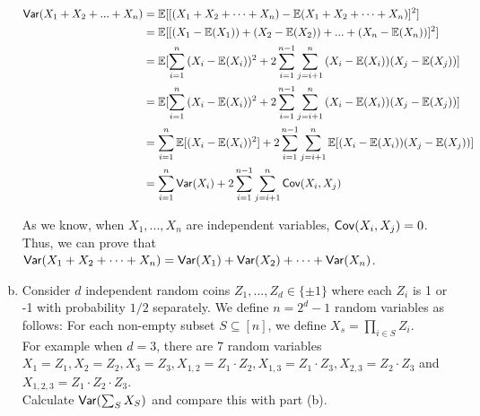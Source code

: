 \begin{problem}[30 points]
\begin{enumerate}[(a)]
\begin{equation}
\begin{aligned}
\mathsf{Var}(X_1 + X_2 + ... + X_n) &= \operatorname*{\mathbb{E}}[[(X_1 + X_2 + \cdots + X_n) - \operatorname*{\mathbb{E}}(X_1 + X_2 + \cdots + X_n)]^2] \\
& = \operatorname*{\mathbb{E}}[[(X_1 - \operatorname*{\mathbb{E}}(X_1)) + (X_2 - \operatorname*{\mathbb{E}}(X_2)) + ... + (X_n - \operatorname*{\mathbb{E}}(X_n))]^2] \\
& = \operatorname*{\mathbb{E}}[\sum_{i=1}^{n}{(X_i - \operatorname*{\mathbb{E}}(X_i))^2} + 2\sum_{i=1}^{n-1}\sum_{j=i+1}^{n}{(X_i - \operatorname*{\mathbb{E}}(X_i))(X_j - \operatorname*{\mathbb{E}}(X_j))}] \\
& = \operatorname*{\mathbb{E}}[\sum_{i=1}^{n}{(X_i - \operatorname*{\mathbb{E}}(X_i))^2} + 2\sum_{i=1}^{n-1}\sum_{j=i+1}^{n}{(X_i - \operatorname*{\mathbb{E}}(X_i))(X_j - \operatorname*{\mathbb{E}}(X_j))}] \\
& = \sum_{i=1}^{n}{\operatorname*{\mathbb{E}}[(X_i - \operatorname*{\mathbb{E}}(X_i))^2]} + 2\sum_{i=1}^{n-1}\sum_{j=i+1}^{n}{\operatorname*{\mathbb{E}}[(X_i - \operatorname*{\mathbb{E}}(X_i))(X_j - \operatorname*{\mathbb{E}}(X_j))]} \notag \\
& = \sum_{i=1}^{n}{\mathsf{Var}(X_i)} + 2\sum_{i=1}^{n-1}\sum_{j=i+1}^{n}{\mathsf{Cov}(X_i, X_j)} \notag \\
\end{aligned}
\end{equation}

As we know, when $X_1, ..., X_n$ are independent variables, $\mathsf{Cov}(X_i, X_j) = 0$. \\
Thus, we can prove that $\mathsf{Var}(X_1 + X_2 + \cdots + X_n) = \mathsf{Var}(X_1) + \mathsf{Var}(X_2) + \cdots + \mathsf{Var}(X_n)$.


\item Consider $d$ independent random coins $Z_1, ..., Z_d \in \{\pm 1\}$ where each $Z_i$ is 1 or -1 with probability $1/2$ separately.
We define $n = 2^d - 1$ random variables as follows: For each non-empty subset $S \subseteq [n]$, we define $X_s = \prod_{i \in S} Z_i$. \\
For example when $d = 3$, there are 7 random variables $X_1 = Z_1, X_2 = Z_2, X_3 = Z_3, X_{1,2} = Z_1 \cdot Z_2, X_{1,3} = Z_1 \cdot Z_3, X_{2,3} = Z_2 \cdot Z_3$
and $X_{1,2,3} = Z_1 \cdot Z_2 \cdot Z_3$. \\
Calculate $\mathsf{Var}(\sum_{S}X_S)$ and compare this with part (b).

\Answer


\end{enumerate}
\end{problem}

